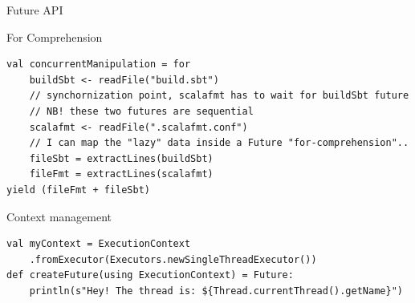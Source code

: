 \documentclass[presentation, 9pt]{beamer}\mode<presentation>{\usetheme{AMSBolognaFC}}
\begin{document}
\begin{frame}{Future API}
\begin{alertblock}{For Comprehension }
\begin{tcolorbox}[left=0pt, top=0pt, bottom=0pt]
\begin{verbatim}
val concurrentManipulation = for
	buildSbt <- readFile("build.sbt")
	// synchornization point, scalafmt has to wait for buildSbt future
	// NB! these two futures are sequential
	scalafmt <- readFile(".scalafmt.conf") 
	// I can map the "lazy" data inside a Future "for-comprehension"..
	fileSbt = extractLines(buildSbt)
	fileFmt = extractLines(scalafmt)
yield (fileFmt + fileSbt)
					\end{verbatim}
				\end{tcolorbox}
\end{alertblock}
\begin{alertblock}{Context management}
		\begin{tcolorbox}[left=0pt, top=0pt, bottom=0pt]
						\begin{verbatim}
val myContext = ExecutionContext
	.fromExecutor(Executors.newSingleThreadExecutor())
def createFuture(using ExecutionContext) = Future:
	println(s"Hey! The thread is: ${Thread.currentThread().getName}")


\end{verbatim}
\end{tcolorbox}
\end{alertblock}
\end{frame}
\end{document}
